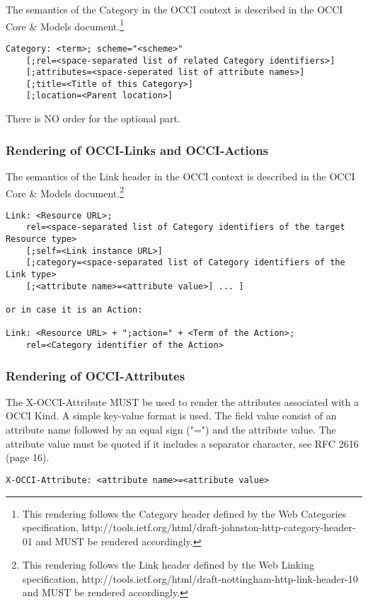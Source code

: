 \documentclass[10pt,a4paper]{article}
\begin{document}
The semantics of the Category in the OCCI context is described in the
OCCI Core \& Models document.\footnote{This rendering follows the
  Category header defined by the Web Categories specification,
  http://tools.ietf.org/html/draft-johnston-http-category-header-01
  and MUST be rendered accordingly.}

\begin{verbatim}
Category: <term>; scheme="<scheme>"
    [;rel=<space-separated list of related Category identifiers>]
    [;attributes=<space-seperated list of attribute names>]
    [;title=<Title of this Category>]    
    [;location=<Parent location>]
\end{verbatim}
There is NO order for the optional part.

\subsubsection{Rendering of OCCI-Links and OCCI-Actions}
The semantics of the Link header in the OCCI context is described in
the OCCI Core \& Models document.\footnote{This rendering follows the
  Link header defined by the Web Linking specification,
  http://tools.ietf.org/html/draft-nottingham-http-link-header-10 and
  MUST be rendered accordingly.}

\begin{verbatim}
Link: <Resource URL>;
    rel=<space-separated list of Category identifiers of the target Resource type>
    [;self=<Link instance URL>]
    [;category=<space-separated list of Category identifiers of the Link type>
    [;<attribute name>=<attribute value>] ... ]

or in case it is an Action:

Link: <Resource URL> + ";action=" + <Term of the Action>;
    rel=<Category identifier of the Action>
\end{verbatim}

\subsubsection{Rendering of OCCI-Attributes}
The X-OCCI-Attribute MUST be used to render the attributes associated
with a OCCI Kind. A simple key-value format is used. The field value
consist of an attribute name followed by an equal sign ("=") and the
attribute value. The attribute value must be quoted if it includes a
separator character, see RFC 2616 (page 16).

\begin{verbatim}
X-OCCI-Attribute: <attribute name>=<attribute value>
\end{verbatim}
\end{document}
